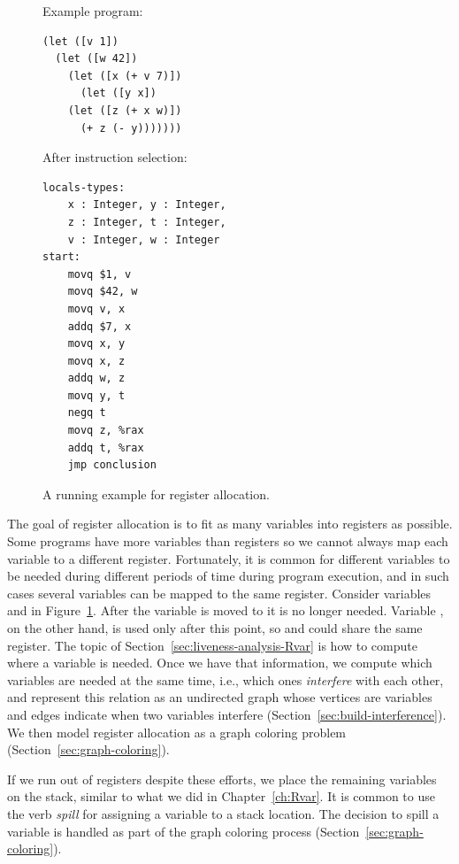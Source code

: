 \documentclass[11pt]{book}
\begin{document}
\begin{figure}
\begin{minipage}{0.45\textwidth}
Example \LangVar{} program:
\begin{lstlisting}
(let ([v 1])
  (let ([w 42])
    (let ([x (+ v 7)])
      (let ([y x])
	(let ([z (+ x w)])
	  (+ z (- y)))))))
\end{lstlisting}
\end{minipage}
\begin{minipage}{0.45\textwidth}
After instruction selection:
\begin{lstlisting}
locals-types:
    x : Integer, y : Integer,
    z : Integer, t : Integer,
    v : Integer, w : Integer
start:
    movq $1, v
    movq $42, w
    movq v, x
    addq $7, x
    movq x, y
    movq x, z
    addq w, z
    movq y, t
    negq t
    movq z, %rax
    addq t, %rax
    jmp conclusion
\end{lstlisting}
\end{minipage}
\caption{A running example for register allocation.}
\label{fig:reg-eg}
\end{figure}

The goal of register allocation is to fit as many variables into
registers as possible. Some programs have more variables than
registers so we cannot always map each variable to a different
register. Fortunately, it is common for different variables to be
needed during different periods of time during program execution, and
in such cases several variables can be mapped to the same register.
Consider variables  and  in Figure~\ref{fig:reg-eg}.
After the variable  is moved to  it is no longer
needed.  Variable , on the other hand, is used only after this
point, so  and  could share the same register. The
topic of Section~\ref{sec:liveness-analysis-Rvar} is how to compute
where a variable is needed.  Once we have that information, we compute
which variables are needed at the same time, i.e., which ones
\emph{interfere} with each other, and represent this relation as an
undirected graph whose vertices are variables and edges indicate when
two variables interfere (Section~\ref{sec:build-interference}). We
then model register allocation as a graph coloring problem
(Section~\ref{sec:graph-coloring}).

If we run out of registers despite these efforts, we place the
remaining variables on the stack, similar to what we did in
Chapter~\ref{ch:Rvar}. It is common to use the verb \emph{spill}
for assigning a variable to a stack location. The decision to spill a
variable is handled as part of the graph coloring process
(Section~\ref{sec:graph-coloring}).
\end{document}
